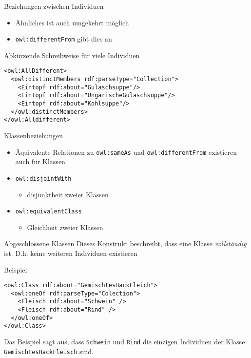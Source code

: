 \documentclass{beamer}
\begin{document}
\begin{frame}[fragile]{Beziehungen zwischen Individuen}
\begin{itemize}
\item Ähnliches ist auch umgekehrt möglich
\item \texttt{owl:differentFrom} gibt dies an
\end{itemize}
\begin{block}{Abkürzende Schreibweise für viele Individuen}
\begin{lstlisting}[lang="xml"]
<owl:AllDifferent>
  <owl:distinctMembers rdf:parseType="Collection">
    <Eintopf rdf:about="Gulaschsuppe"/>
    <Eintopf rdf:about="UngarischeGulaschsuppe"/>
    <Eintopf rdf:about="Kohlsuppe"/>
  </owl:distinctMembers>
</owl:Alldifferent>
\end{lstlisting}
\end{block}

\end{frame}
%
\begin{frame}[fragile]{Klassenbeziehungen}
\begin{itemize}
\item Äquivalente Relationen zu \texttt{owl:sameAs} und \texttt{owl:differentFrom}
existieren auch für Klassen
\item \texttt{owl:disjointWith}
\begin{itemize}
 \item disjunktheit zweier Klassen
\end{itemize}
\item \texttt{owl:equivalentClass}
\begin{itemize}
 \item Gleichheit zweier Klassen
\end{itemize}
\end{itemize}
\end{frame}
%
\begin{frame}[fragile]{Abgeschlossene Klassen}
Dieses Konstrukt beschreibt, dass eine Klasse \emph{vollständig} ist. D.h. keine weiteren Individuen existieren		
\begin{block}{Beispiel}
\begin{lstlisting}[lang="xml"]
<owl:Class rdf:about="GemischtesHackFleich">
  <owl:oneOf rdf:parseType="Colection">
    <Fleisch rdf:about="Schwein" />
    <Fleisch rdf:about="Rind" />
  </owl:oneOf>
</owl:Class>
\end{lstlisting}
\end{block}
Das Beispiel sagt aus, dass \texttt{Schwein} und \texttt{Rind} die einzigen Individuen der Klasse \texttt{GemischtesHackFleisch} sind.
\end{frame}
\end{document}
